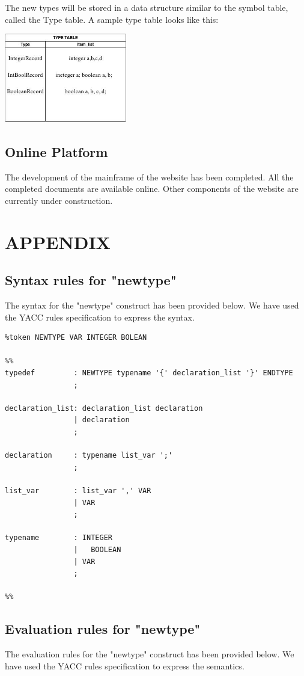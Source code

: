 The new types will be stored in a data structure similar to the symbol table, called the Type table. A sample type table looks like this:
\linebreak
\begin{center}
\includegraphics[width=0.4\textwidth]{./type_table.jpg}\\[1in]
\end{center}


\section{Online Platform}
The development of the mainframe of the website has been completed. All the completed documents are available online. Other components of the website are currently under construction. 

\chapter{APPENDIX}
\section{Syntax rules for "newtype"}
The syntax for the "newtype" construct has been provided below. We have used the YACC rules specification to express the syntax.

\begin{verbatim}
%token NEWTYPE VAR INTEGER BOLEAN

%%
typedef			: NEWTYPE typename '{' declaration_list '}' ENDTYPE
				;

declaration_list: declaration_list declaration
				| declaration
				;

declaration		: typename list_var ';'
				;

list_var		: list_var ',' VAR	
				| VAR				
				;

typename		: INTEGER
				|	BOOLEAN
				| VAR   
				;
				
%%
\end{verbatim}

\section{Evaluation rules for "newtype"}
The evaluation rules for the "newtype" construct has been provided below. We have used the YACC rules specification to express the semantics.


